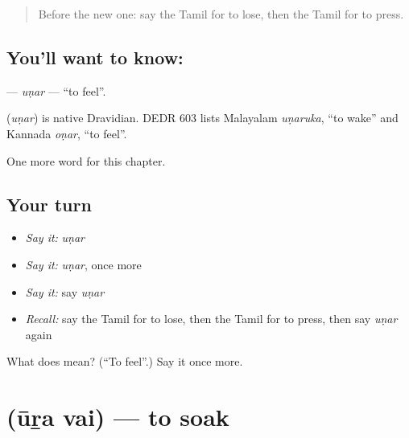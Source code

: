 \label{lesson:TA-C196-unar}



\begin{quote}
Before the new one: say the Tamil for to lose, then the Tamil for to press.
\end{quote}

\subsection*{You'll want to know: }
\textbf{} — \emph{uṇar} — \textquotedblleft{}to feel\textquotedblright{}.

\begin{cousinweb}
\textbf{} (\emph{uṇar}) is native Dravidian. DEDR 603 lists Malayalam \emph{uṇaruka}, \textquotedblleft{}to wake\textquotedblright{} and Kannada \emph{oṇar}, \textquotedblleft{}to feel\textquotedblright{}.
\end{cousinweb}

\begin{grammarlens}[title={What you've built}]
One more word for this chapter.
\end{grammarlens}

\subsection*{Your turn}
\begin{itemize}
\raggedright
  \item \emph{Say it:} \emph{uṇar}
  \item \emph{Say it:} \emph{uṇar}, once more
  \item \emph{Say it:} say \emph{uṇar}
  \item \emph{Recall:} say the Tamil for to lose, then the Tamil for to press, then say \emph{uṇar} again
\end{itemize}

\begin{tcolorbox}[breakable,colback=teal!4,colframe=teal!35!black,title={Before you move on}]
What does  mean? (\textquotedblleft{}To feel\textquotedblright{}.) Say it once more.
\end{tcolorbox}
\section[\texorpdfstring{\ta{ஊற} \ta{வை} (ūṟa vai)}{ஊற வை (ūṟa vai)}]{  (ūṟa vai) — to soak}

\label{lesson:TA-C196-ura-vai}



